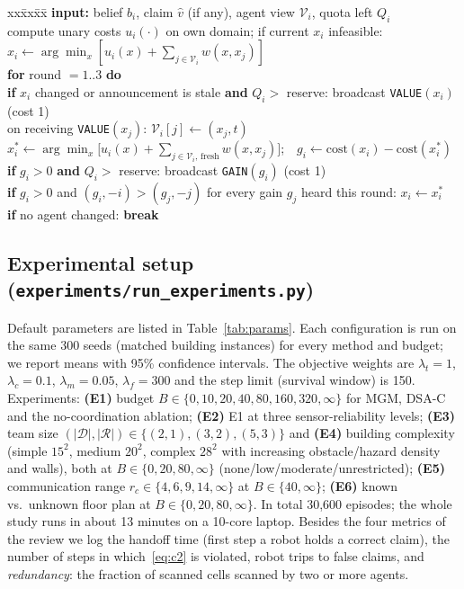 \documentclass{article}
\newcommand{\D}{\mathscr{D}}
\newcommand{\R}{\mathscr{R}}
\begin{document}
\begin{algorithm}[t]
\small
\caption{One MGM allocation epoch at agent $i$ (decentralised; all agents run it in parallel)}\label{alg:mgm}
\begin{tabbing}
xx\=xx\=xx\=\kill
\textbf{input:} belief $b_i$, claim $\hat v$ (if any), agent view $\mathcal V_i$, quota left $Q_i$\\
compute unary costs $u_i(\cdot)$ on own domain; if current $x_i$ infeasible: $x_i\leftarrow\arg\min_x[u_i(x)+\sum_{j\in\mathcal V_i}w(x,x_j)]$\\
\textbf{for} round $=1..3$ \textbf{do}\\
\> \textbf{if} $x_i$ changed or announcement is stale \textbf{and} $Q_i>$ reserve: broadcast \texttt{VALUE}$(x_i)$ \hfill (cost 1)\\
\> on receiving \texttt{VALUE}$(x_j)$: $\mathcal V_i[j]\leftarrow(x_j,t)$\\
\> $x_i^\ast\leftarrow\arg\min_x\big[u_i(x)+\sum_{j\in\mathcal V_i,\,\text{fresh}}w(x,x_j)\big]$;\ \ $g_i\leftarrow \mathrm{cost}(x_i)-\mathrm{cost}(x_i^\ast)$\\
\> \textbf{if} $g_i>0$ \textbf{and} $Q_i>$ reserve: broadcast \texttt{GAIN}$(g_i)$ \hfill (cost 1)\\
\> \textbf{if} $g_i>0$ and $(g_i,-i)>(g_j,-j)$ for every gain $g_j$ heard this round: $x_i\leftarrow x_i^\ast$\\
\> \textbf{if} no agent changed: \textbf{break}
\end{tabbing}
\end{algorithm}

\subsection{Experimental setup (\texttt{experiments/run\_experiments.py})}
Default parameters are listed in Table~\ref{tab:params}. Each configuration is run on the same 300 seeds (matched
building instances) for every method and budget; we report means with 95\% confidence intervals. The objective weights
are $\lambda_t=1$, $\lambda_c=0.1$, $\lambda_m=0.05$, $\lambda_f=300$ and the step limit (survival window) is 150.
Experiments: \textbf{(E1)} budget $B\in\{0,10,20,40,80,160,320,\infty\}$ for MGM, DSA-C and the no-coordination
ablation;
\textbf{(E2)} E1 at three sensor-reliability levels; \textbf{(E3)} team size
$(|\D|,|\R|)\in\{(2,1),(3,2),(5,3)\}$ and \textbf{(E4)} building complexity (simple $15^2$, medium $20^2$, complex $28^2$
with increasing obstacle/hazard density and walls), both at $B\in\{0,20,80,\infty\}$ (none/low/moderate/unrestricted);
\textbf{(E5)} communication range $r_c\in\{4,6,9,14,\infty\}$ at $B\in\{40,\infty\}$; \textbf{(E6)} known vs.\ unknown
floor plan at $B\in\{0,20,80,\infty\}$. In total 30{,}600 episodes; the whole study runs in about 13 minutes on a
10-core laptop. Besides the four metrics of the review we log the handoff
time (first step a robot holds a correct claim), the number of steps in which~\eqref{eq:c2} is violated, robot trips to
false claims, and \emph{redundancy}: the fraction of scanned cells scanned by two or more agents.
\end{document}
